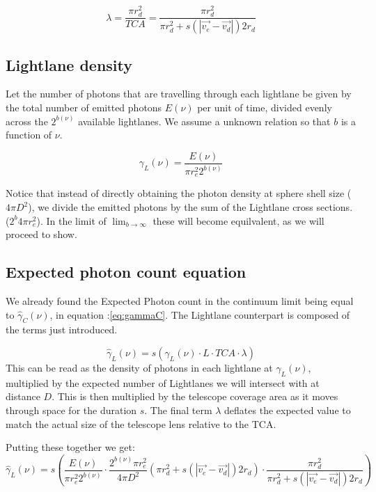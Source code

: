 \documentclass[notitlepage]{article}
\begin{document}
\begin{equation}
\lambda =\frac{\pi r_d^2}{TCA} =
 \frac{\pi r_d^2}{\pi r_d^2 + s (| \vec{v_e}-\vec{v_d} |)  2r_d}	
\label{eq:lambda}
\end{equation}



\subsection{Lightlane density}

Let the number of photons that are travelling through each lightlane be given by the total number of emitted photons $E(\nu)$ per unit of time, divided evenly across the $2^{b(\nu)}$ available lightlanes. We assume a unknown relation so that $b$ is a function of $\nu$.

\begin{equation}
\gamma_L(\nu) = \frac{E(\nu)}{\pi r_e^2 2^{b(\nu)}}
\label{eq:gamma_L}
\end{equation}

Notice that instead of directly obtaining the photon density at sphere shell size ($4\pi D^2$), we divide the emitted photons by the sum of the Lightlane  cross sections.  ($2^b4\pi r_e^2$). In the limit of $\lim_{b \rightarrow \infty}$ these will become equilvalent, as we will proceed to show.

\subsection{Expected photon count equation}
We already found the Expected Photon count in the continuum limit being equal to $\hat{\gamma}_C(\nu)$, in equation :\ref{eq:gammaC}. The Lightlane counterpart is composed of the terms just introduced. 

\begin{equation}
\hat{\gamma}_L(\nu) = s \left( \gamma_L(\nu) \cdot L \cdot  TCA \cdot \lambda \right) 
\label{eq:expectedPhotonsFull}
\end{equation}
This can be read as the density of photons in each lightlane at $\gamma_L(\nu)$, multiplied by the expected number of Lightlanes we will intersect with at distance $D$. This is then multiplied by the telescope coverage area as it moves through space for the duration $s$. The final term $\lambda$ deflates the expected value to match the actual size of the telescope lens relative to the TCA.

Putting these together we get:
\begin{equation}
\hat{\gamma}_L(\nu) =   s\left( \frac{E(\nu)}{\pi r_e^2 2^{b(\nu)}}
	\cdot   \frac{2^{b(\nu)} \pi r_e^2 } {4 \pi D^2} 
    \left(  \pi r_d^2+ s (| \vec{v_e}-\vec{v_d} |)  2r_d \right)
	\cdot \frac{\pi r_d^2}{\pi r_d^2 + s (| \vec{v_e}-\vec{v_d} |)   2r_d }	\right)
\end{equation}
\end{document}

